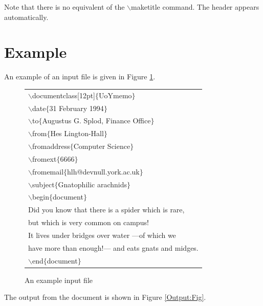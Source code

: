 \documentclass[12pt,a4paper]{article}
\newcommand{\cmdsty}[1]{\textsf{#1}}
\newcommand{\cmd}[1]{\cmdsty{$\backslash$#1}}
\newcommand{\pcmd}[2]{\cmdsty{\cmd{#1}$\{$#2$\}$}}
\begin{document}
Note that there is no equivalent of the \cmd{maketitle} command.  The
header appears automatically.

\section{Example}

An example of an input file is given in Figure \ref{Example1:Fig}.
\begin{figure}[p]
{\sffamily
\begin{tabular}{l}
\pcmd{documentclass[12pt]}{UoYmemo}\\
\pcmd{date}{31 February 1994}\\
\pcmd{to}{Augustus G. Splod, Finance Office}\\
\pcmd{from}{Hes Lington-Hall}\\
\pcmd{fromaddress}{Computer Science}\\
\pcmd{fromext}{6666}\\
\pcmd{fromemail}{hlh@devnull.york.ac.uk}\\
\pcmd{subject}{Gnatophilic arachnids}\\
\pcmd{begin}{document}\\
Did you know that there is a spider which is rare,\\
but which is very common on campus!\\
It lives under bridges over water ---of which we\\
have more than enough!--- and eats gnats and midges.\\
\pcmd{end}{document}
\end{tabular}
}
\caption{An example input file}\label{Example1:Fig}
\end{figure}
The output from the document is shown in Figure \ref{Output:Fig}.
\end{document}
